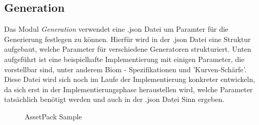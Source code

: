\subsection{Generation}

Das Modul \textit{Generation} verwendet eine .json Datei um Paramter für die Generierung festlegen zu können. 
Hierfür wird in der .json Datei eine Struktur aufgebaut, welche Parameter für verschiedene Generatoren strukturiert.
Unten aufgeführt ist eine beispielhafte Implementierung mit einigen Parameter, die vorstellbar sind, 
unter anderem Biom - Spezifikationen und 'Kurven-Schärfe'.\\
Diese Datei wird sich noch im Laufe der Implementierung konkreter entwickeln, da sich erst in der 
Implementierungsphase heraustellen wird, welche Parameter tatsächlich benötigt werden und auch in der 
.json Datei Sinn ergeben.\par

\begin{figure}[htbp]
    \centering
    
    \caption{AssetPack Sample}
\end{figure}
\pagebreak